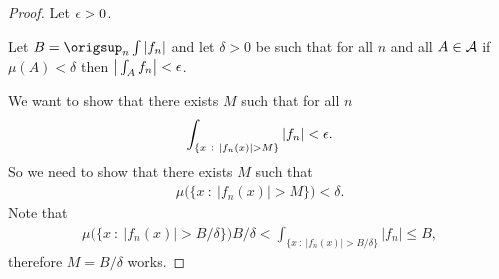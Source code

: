 \begin{proof}
  Let $\epsilon > 0$.

  Let $B = \origsup_{n} \int |f_n|$ and let $\delta > 0$ be such that for all $n$ and all $A \in \mathcal A$
  if $\mu(A) < \delta$ then $\big|\int_A f_n\big| < \epsilon$.

  We want to show that there exists $M$ such that for all $n$
  \begin{align*}
    \int_{\{x ~:~ |f_n(x)| > M\}} |f_n| < \epsilon.
  \end{align*}
  So we need to show that there exists $M$ such that
  \begin{align*}
    \mu\big(\{x ~:~ |f_n(x)| > M\}\big) < \delta.
  \end{align*}
  Note that
  \begin{align*}
    \mu\big(\{x ~:~ |f_n(x)| > B/\delta\}\big) B/\delta < \int_{\{x ~:~ |f_n(x)| > B/\delta\}} |f_n| \leq B,
  \end{align*}
  therefore $M = B/\delta$ works.
\end{proof}